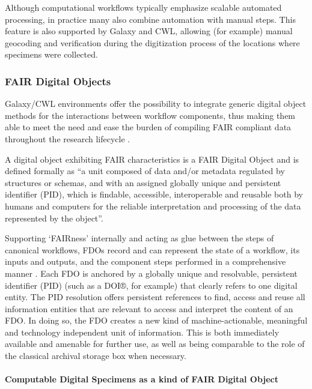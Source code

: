 Although computational workflows typically emphasize scalable automated
processing, in practice many also combine automation with manual steps.
This feature is also supported by Galaxy and CWL, allowing (for example)
manual geocoding and verification during the digitization process of the
locations where specimens were collected.

\subsubsection{FAIR Digital Objects}\label{fair-digital-objects-1}

Galaxy/CWL environments offer the possibility to integrate generic
digital object methods \cite{ch8-44,ch8-45,ch8-46} for the interactions between
workflow components, thus making them able to meet the need and ease the
burden of compiling FAIR compliant data throughout the research
lifecycle \cite{ch8-27}.

A digital object exhibiting FAIR characteristics is a FAIR Digital
Object \cite{De Smedt 2020} and is defined formally as ``a unit composed of data
and/or metadata regulated by structures or schemas, and with an assigned
globally unique and persistent identifier (PID), which is findable,
accessible, interoperable and reusable both by humans and computers for
the reliable interpretation and processing of the data represented by
the object''.

Supporting `FAIRness' internally and acting as glue between the steps of
canonical workflows, FDOs record and can represent the state of a
workflow, its inputs and outputs, and the component steps performed in a
comprehensive manner \cite{ch8-27}. Each FDO is anchored by a globally unique
and resolvable, persistent identifier (PID) (such as a DOI®, for
example) that clearly refers to one digital entity. The PID resolution
offers persistent references to find, access and reuse all information
entities that are relevant to access and interpret the content of an
FDO. In doing so, the FDO creates a new kind of machine-actionable,
meaningful and technology independent unit of information. This is both
immediately available and amenable for further use, as well as being
comparable to the role of the classical archival storage box when
necessary.

\paragraph{Computable Digital Specimens as a kind of FAIR Digital Object}\label{computable-digital-specimens-as-a-kind-of-fair-digital-object}

